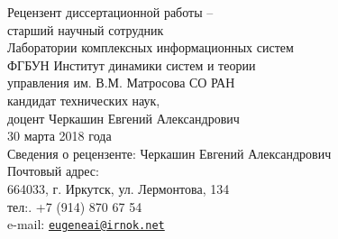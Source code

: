 \documentclass[14pt]{extarticle}
\begin{document}
\vspace{2em}
\noindent{}Рецензент диссертационной работы --\\
старший научный сотрудник\\
Лаборатории комплексных информационных систем\\
ФГБУН Институт динамики систем и теории\\
управления им. В.М. Матросова СО РАН\\
кандидат технических наук,\\
доцент \hfil Черкашин Евгений Александрович\linebreak{}{}\\[0.5em]
30 марта 2018 года\\[0.5em]

\noindent{}Сведения о рецензенте: Черкашин Евгений Александрович\\[0.5em]
Почтовый адрес:\\
664033, г. Иркутск, ул. Лермонтова, 134\\[0.2em]
тел:. +7 (914) 870 67 54\\[0.2em]
e-mail: \href{mailto:eugeneai@irnok.net}{\nolinkurl{eugeneai@irnok.net}}
\end{document}
